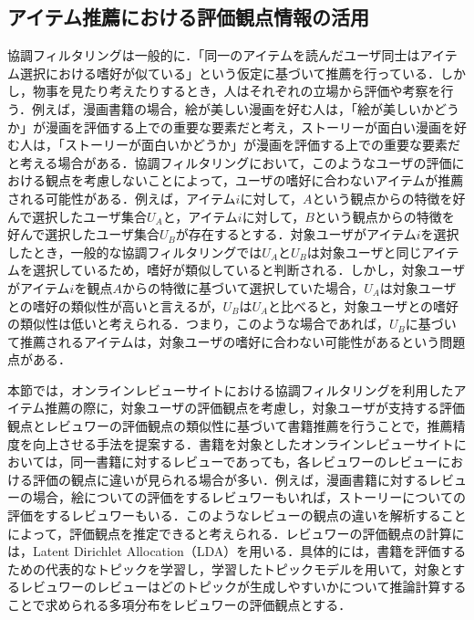 \documentclass[a4paper,11pt,oneside,openany]{jsbook}
\begin{document}
\subsection{アイテム推薦における評価観点情報の活用}
協調フィルタリングは一般的に．「同一のアイテムを読んだユーザ同士はアイテム選択における嗜好が似ている」という仮定に基づいて推薦を行っている．しかし，物事を見たり考えたりするとき，人はそれぞれの立場から評価や考察を行う．例えば，漫画書籍の場合，絵が美しい漫画を好む人は，「絵が美しいかどうか」が漫画を評価する上での重要な要素だと考え，ストーリーが面白い漫画を好む人は，「ストーリーが面白いかどうか」が漫画を評価する上での重要な要素だと考える場合がある．協調フィルタリングにおいて，このようなユーザの評価における観点を考慮しないことによって，ユーザの嗜好に合わないアイテムが推薦される可能性がある．例えば，アイテム$i$に対して，$A$という観点からの特徴を好んで選択したユーザ集合$U_A$と，アイテム$i$に対して，$B$という観点からの特徴を好んで選択したユーザ集合$U_B$が存在するとする．対象ユーザがアイテム$i$を選択したとき，一般的な協調フィルタリングでは$U_A$と$U_B$は対象ユーザと同じアイテムを選択しているため，嗜好が類似していると判断される．しかし，対象ユーザがアイテム$i$を観点$A$からの特徴に基づいて選択していた場合，$U_A$は対象ユーザとの嗜好の類似性が高いと言えるが，$U_B$は$U_A$と比べると，対象ユーザとの嗜好の類似性は低いと考えられる．つまり，このような場合であれば，$U_B$に基づいて推薦されるアイテムは，対象ユーザの嗜好に合わない可能性があるという問題点がある．
\par
本節では，オンラインレビューサイトにおける協調フィルタリングを利用したアイテム推薦の際に，対象ユーザの評価観点を考慮し，対象ユーザが支持する評価観点とレビュワーの評価観点の類似性に基づいて書籍推薦を行うことで，推薦精度を向上させる手法を提案する．書籍を対象としたオンラインレビューサイトにおいては，同一書籍に対するレビューであっても，各レビュワーのレビューにおける評価の観点に違いが見られる場合が多い．例えば，漫画書籍に対するレビューの場合，絵についての評価をするレビュワーもいれば，ストーリーについての評価をするレビュワーもいる．このようなレビューの観点の違いを解析することによって，評価観点を推定できると考えられる．レビュワーの評価観点の計算には，Latent Dirichlet Allocation（LDA）\cite{Blei}を用いる．具体的には，書籍を評価するための代表的なトピックを学習し，学習したトピックモデルを用いて，対象とするレビュワーのレビューはどのトピックが生成しやすいかについて推論計算することで求められる多項分布をレビュワーの評価観点とする．
\end{document}
